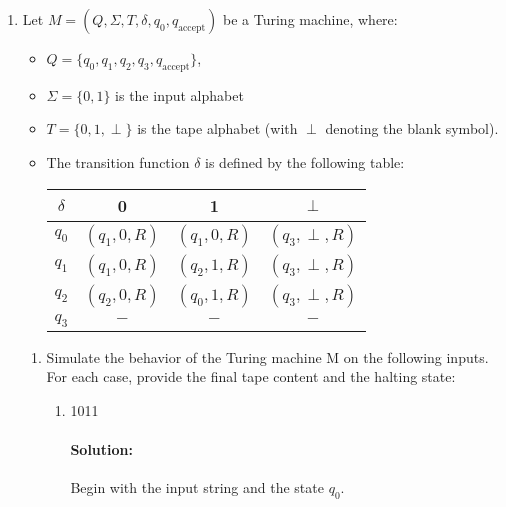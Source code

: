\documentclass{article}
\begin{document}
\begin{enumerate} 

    \item Let $M=(Q,\Sigma,T,\delta,q_0,q_{\text{accept}})$ be a Turing machine, where:
        \begin{itemize}
            \item[] $Q=\{q_0,q_1,q_2,q_3,q_{\text{accept}}\} $,
            \item[] $\Sigma=\{0,1\} $ is the input alphabet
            \item[] $T=\{0,1,\perp \} $ is the tape alphabet (with $\perp $ denoting the blank symbol).
            \item[] The transition function $\delta$ is defined by the following table:
                    \centering
                    \begin{tabular}{c|c|c|c}
                    $\delta$ & 0 & 1 & $\perp $ \\
                    \hline
                    $q_0$ &$(q_1,0,R)$ &$(q_1,0,R)$ &$(q_3,\perp ,R)$ \\
                    $q_1$ &$(q_1,0,R)$ &$(q_2,1,R)$ &$(q_3,\perp ,R)$ \\
                    $q_2$ &$(q_2,0,R)$ &$(q_0,1,R)$ &$(q_3,\perp ,R)$ \\
                    $q_3$ &$-$ &$-$ &$-$ \\
                    \end{tabular}
        \end{itemize}

        \begin{enumerate}
            \item Simulate the behavior of the Turing machine M on the following inputs. For each case, provide the final tape content and the halting state:
            \begin{enumerate}
                \item  1011
                    \paragraph{Solution: } Begin with the input string and the state $q_0$. 

                    \begin{center}
                        \centering


\end{center}
\end{enumerate}
\end{enumerate}
\end{enumerate}
\end{document}
